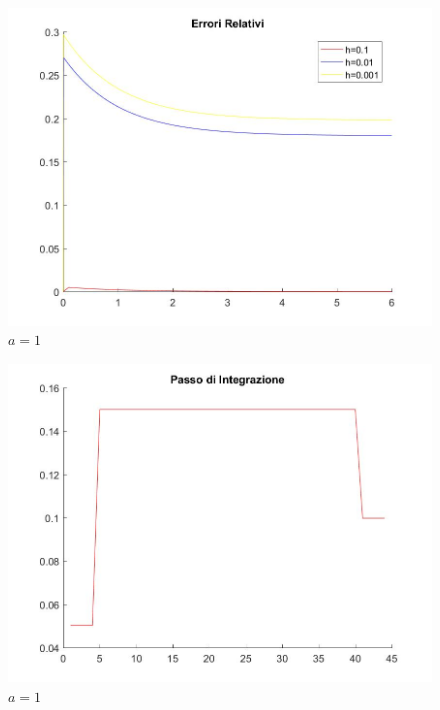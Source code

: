 \documentclass[11pt,a4paper,twoside,openright,titlepage,
headinclude,footinclude,BCOR5mm,
numbers=noenddot,cleardoublepage=empty,
tablecaptionabove]{scrbook}
\begin{document}
\begin{figure}[h!]
\centering
\includegraphics[width=\textwidth]{figs/errori_relativi_1.jpg}
\caption{$a=1$}
\end{figure}
\begin{figure}[h!]
\centering
\includegraphics[width=\textwidth]{figs/step_ode_1.jpg}
\caption{$a=1$}
\end{figure}
\end{document}

